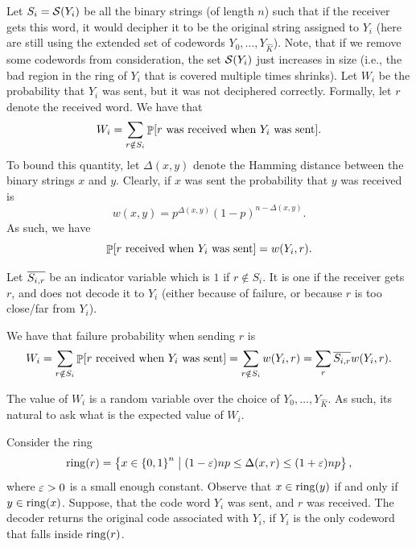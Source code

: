%
%
Let $S_i = \StringsX{Y_i}$ be all the binary strings (of length $n$)
such that if the receiver gets this word, it would decipher it to be
the original string assigned to $Y_i$ (here are still using the
extended set of codewords $Y_0, \ldots, Y_{\widehat{K}}$). Note, that
if we remove some codewords from consideration, the set
$\StringsX{Y_i}$ just increases in size (i.e., the bad region in the
ring of $Y_i$ that is covered multiple times shrinks). Let $W_i$ be
the probability that $Y_i$ was sent, but it was not deciphered
correctly. Formally, let $r$ denote the received word. We have that
\begin{equation}
    W_i = \sum_{r \notin S_i} \Prob{ \MakeSBig  r \text{ was received when
       } Y_i \text{ was sent}}.
    \eqlab{W:i}
\end{equation}
To bound this quantity, let $\Delta(x,y)$ denote the Hamming distance
between the binary strings $x$ and $y$. Clearly, if $x$ was sent the
probability that $y$ was received is 
\begin{equation*}
    w(x,y)%
    =%
    p^{\Delta(x,y)} (1-p)^{n - \Delta(x,y)}.
\end{equation*}
As such, we have
\begin{equation*}
    \Prob{ \MakeSBig r \text{ received when } Y_i \text{ was sent}} =
    w(Y_i, r).
\end{equation*}

\begin{defn}
    Let $\overline{S_{{i},{r}}}$ be an indicator variable which is $1$ if
    $r \notin S_i$. It is one if the receiver gets $r$, and does not
    decode it to $Y_i$ (either because of failure, or because $r$ is
    too close/far from $Y_i$).
\end{defn}

We have that failure probability when sending $r$ is
\begin{equation}
    W_i%
    =%
    \sum_{r \notin S_i} \Prob{ \MakeSBig r \text{ received when } Y_i \text{ was
          sent}} = \sum_{r \notin S_i} w(Y_i, r)%
    =%
    \sum_{r} \NotInS{i}{r} w(Y_i, r).
    \eqlab{W:i:2}
\end{equation}

The value of $W_i$ is a random variable over the choice of $Y_0,
\ldots, Y_{ \widehat{K}}$. As such, its natural to ask what is the
expected value of $W_i$.


Consider the ring
\begin{equation*}
    \bring{r}%
    =%
    \Set{\bigl. x \in \brc{0,1}^n }{ (1-\eps)n p \leq  \Delta(x, r)
       \leq  (1+\eps)n p},
\end{equation*}
where ${\varepsilon} > 0$ is a small enough constant.  Observe that $x \in
\bring{y}$ if and only if $y \in \bring{x}$.  Suppose, that the code
word $Y_i$ was sent, and $r$ was received. The decoder returns the
original code associated with $Y_i$, if $Y_i$ is the only codeword
that falls inside $\bring{r}$.


